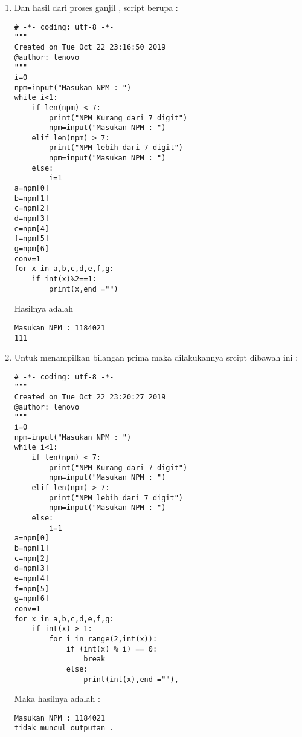 \begin{enumerate}
\begin{verbatim}
    if len(npm) < 7:
        print("NPM Kurang dari 7 digit")
        npm=input("Masukan NPM : ")
    elif len(npm) > 7:
        print("NPM lebih dari 7 digit")
        npm=input("Masukan NPM : ")
    else:
        i=1
a=npm[0]
b=npm[1]
c=npm[2]
d=npm[3]
e=npm[4]
f=npm[5]
g=npm[6]
conv=1
for x in a,b,c,d,e,f,g:
    if int(x)%2==0:
        if int(x)==0:
            x=""
    print(x,end = "")
\end{verbatim}
Maka Hasilnya adalah :
\begin{verbatim}
Masukan NPM : 1184021
8402
\end{verbatim}
\item
Dan hasil dari proses ganjil , script berupa :
\begin{verbatim}
# -*- coding: utf-8 -*-
"""
Created on Tue Oct 22 23:16:50 2019
@author: lenovo
"""
i=0
npm=input("Masukan NPM : ")
while i<1:
    if len(npm) < 7:
        print("NPM Kurang dari 7 digit")
        npm=input("Masukan NPM : ")
    elif len(npm) > 7:
        print("NPM lebih dari 7 digit")
        npm=input("Masukan NPM : ")
    else:
        i=1
a=npm[0]
b=npm[1]
c=npm[2]
d=npm[3]
e=npm[4]
f=npm[5]
g=npm[6]
conv=1
for x in a,b,c,d,e,f,g:
    if int(x)%2==1:
        print(x,end ="")
\end{verbatim}
Hasilnya adalah 
\begin{verbatim}
Masukan NPM : 1184021
111
\end{verbatim}
\item 
Untuk menampilkan bilangan prima maka dilakukannya srcipt dibawah ini :
\begin{verbatim}
# -*- coding: utf-8 -*-
"""
Created on Tue Oct 22 23:20:27 2019
@author: lenovo
"""
i=0
npm=input("Masukan NPM : ")
while i<1:
    if len(npm) < 7:
        print("NPM Kurang dari 7 digit")
        npm=input("Masukan NPM : ")
    elif len(npm) > 7:
        print("NPM lebih dari 7 digit")
        npm=input("Masukan NPM : ")
    else:
        i=1
a=npm[0]
b=npm[1]
c=npm[2]
d=npm[3]
e=npm[4]
f=npm[5]
g=npm[6]
conv=1
for x in a,b,c,d,e,f,g:
    if int(x) > 1:
        for i in range(2,int(x)):
            if (int(x) % i) == 0:
                break
            else:
                print(int(x),end =""),
\end{verbatim}
Maka hasilnya adalah :
\begin{verbatim}
Masukan NPM : 1184021
tidak muncul outputan .
\end{verbatim}
\end{enumerate}



